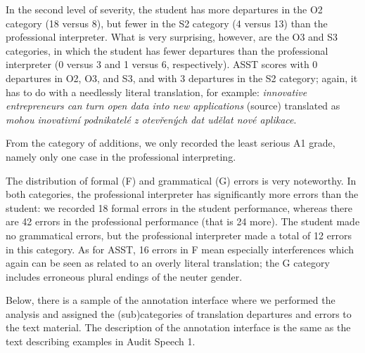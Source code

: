 \documentclass[output=paper]{langscibook}
\begin{document}
In the second level of severity, the student has more departures in the O2 category (18 versus 8), but fewer in the S2 category (4 versus 13) than the professional interpreter. What is very surprising, however, are the O3 and S3 categories, in which the student has fewer departures than the professional interpreter (0 versus 3 and 1 versus 6, respectively). ASST scores with 0 departures in O2, O3, and S3, and with 3 departures in the S2 category; ​​again, it has to do with a needlessly literal translation, for example: \textit{innovative entrepreneurs can turn open data into new applications} (source) translated as \textit{mohou inovativní podnikatelé z otevřených dat udělat nové aplikace}.

From the category of additions, we only recorded the least serious A1 grade, namely only one case in the professional interpreting.

The distribution of formal (F) and grammatical (G) errors is very noteworthy. In both categories, the professional interpreter has significantly more errors than the student: we recorded 18 formal errors in the student performance, whereas there are 42 errors in the professional performance (that is 24 more). The student made no grammatical errors, but the professional interpreter made a total of 12 errors in this category. As for ASST, 16 errors in F mean especially interferences which again can be seen as related to an overly literal translation; the G category includes erroneous plural endings of the neuter gender.

Below, there is a sample of the annotation interface where we performed the analysis and assigned the (sub)categories of translation departures and errors to the text material.
The description of the annotation interface is the same as the text describing examples in Audit Speech 1.
\end{document}
